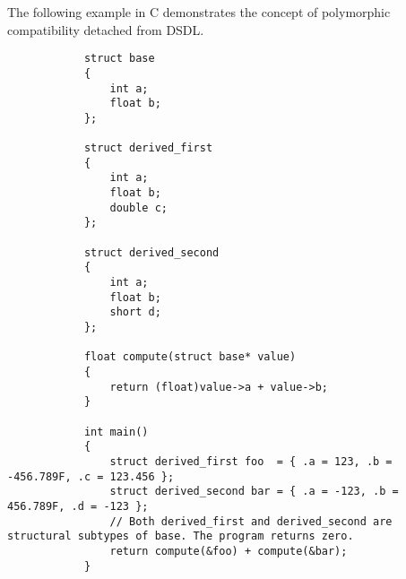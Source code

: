 \begin{remark}[breakable]
    The following example in C demonstrates the concept of polymorphic compatibility detached from DSDL.

    \begin{samepage}
        \begin{verbatim}
            struct base
            {
                int a;
                float b;
            };

            struct derived_first
            {
                int a;
                float b;
                double c;
            };

            struct derived_second
            {
                int a;
                float b;
                short d;
            };

            float compute(struct base* value)
            {
                return (float)value->a + value->b;
            }

            int main()
            {
                struct derived_first foo  = { .a = 123, .b = -456.789F, .c = 123.456 };
                struct derived_second bar = { .a = -123, .b = 456.789F, .d = -123 };
                // Both derived_first and derived_second are structural subtypes of base. The program returns zero.
                return compute(&foo) + compute(&bar);
            }
        \end{verbatim}
    \end{samepage}
\end{remark}

